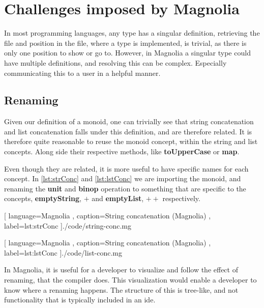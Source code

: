 \section{Challenges imposed by Magnolia} \label{sec:challenges}

In most programming languages, any type has a singular definition, retrieving
the file and position in the file, where a type is implemented, is trivial, as
there is only one position to show or go to. However, in Magnolia a singular
type could have multiple definitions, and resolving this can be complex.
Especially communicating this to a user in a helpful manner.


\subsection{Renaming}

Given our definition of a monoid\footnotemark[12]{}, one can trivially see that
string concatenation and list concatenation falls under this definition, and are
therefore related. It is therefore quite reasonable to reuse the monoid
concept, within the string and list concepts. Along side their respective
methods, like \textbf{toUpperCase} or \textbf{map}.

Even though they are related, it is more useful to have specific names for each
concept. In \ref{lst:strConc} and \ref{lst:lstConc} we are importing the
monoid\footnotemark{}, and renaming the \textbf{unit} and \textbf{binop}
operation to something that are specific to the concepts, \textbf{emptyString},
$+$ and \textbf{emptyList}, $++$ respectively.


\begin{code}[H]
  
    [ language=Magnolia
    , caption={String concatenation (Magnolia)}
    , label=lst:strConc
    ]{./code/string-conc.mg}
\end{code}

\begin{code}[H]
  
    [ language=Magnolia
    , caption={String concatenation (Magnolia)}
    , label=lst:lstConc
    ]{./code/list-conc.mg}
\end{code}

In Magnolia, it is useful for a developer to visualize and follow the effect of
renaming, that the compiler does. This visualization would enable a developer
to know where a renaming happens. The structure of this is tree-like, and not
functionality that is typically included in an \gls*{ide}.


